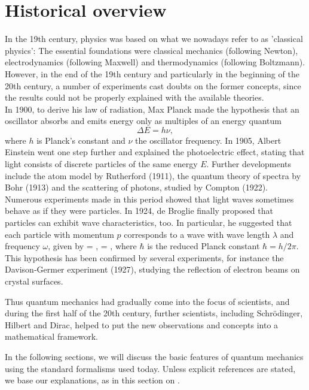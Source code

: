 \section{Historical overview}
In the 19th century, physics was based on what we nowadays refer to as 'classical physics': The essential foundations were classical mechanics (following Newton), electrodynamics (following Maxwell) and thermodynamics (following Boltzmann). However, in the end of the 19th century and particularly in the beginning of the 20th century, a number of experiments cast doubts on the former concepts, since the results could not be properly explained with the available theories.\\
In 1900, to derive his law of radiation, Max Planck made the hypothesis that an oscillator absorbs and emits energy only as multiples of an energy quantum
\[
\Delta E = h\nu,
\]
where $h$ is Planck's constant and $\nu$ the oscillator frequency. In 1905, Albert Einstein went one step further and explained the photoelectric effect, stating that light consists of discrete particles of the same energy $E$. Further developments include the atom model by Rutherford (1911), the quantum theory of spectra by Bohr (1913) and the scattering of photons, studied by Compton (1922). \\
Numerous experiments made in this period showed that light waves sometimes behave as if they were particles.
In 1924, de Broglie finally proposed that particles can exhibit wave characteristics, too. In particular, he suggested that each particle with momentum $p$ corresponds to a wave with wave length $\lambda$ and frequency $\omega$, given by
\be 
\lambda = , \qquad \omega = ,
\label{eq:th1}
\ee
where $\hbar$ is the reduced Planck constant $\hbar = h/2\pi$.
This hypothesis has been confirmed by several experiments, for instance the Davison-Germer experiment (1927), studying the reflection of electron beams on crystal surfaces.

Thus quantum mechanics had gradually come into the focus of scientists, and during the first half of the 20th century, further scientists, including Schr\"odinger, Hilbert and Dirac,
helped to put the new observations and concepts into a mathematical framework. 

In the following sections, we will discuss the basic features of quantum mechanics using the standard formalisms used today. Unless explicit references are stated, we base our explanations, as in this section  on \cite{liboff1992introductory, griffiths2005introduction, SkriptZ,SkriptR}.



